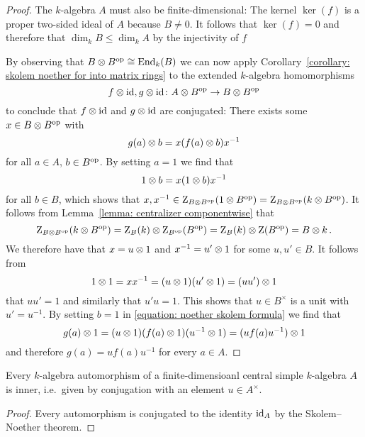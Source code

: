 \begin{proof}
  The $k$-algebra $A$ must also be finite-dimensional:
  The kernel $\ker(f)$ is a proper two-sided ideal of $A$ because $B \neq 0$.
  It follows that $\ker(f) = 0$ and therefore that $\dim_k B \leq \dim_k A$ by the injectivity of $f$
  
  By observing that $B \mathbin{\otimes} B^{\operatorname{op}} \cong \operatorname{End}_k(B)$ we can now apply Corollary~\ref{corollary: skolem noether for into matrix rings} to the extended $k$-algebra homomorphisms
  \[
            f \mathbin{\otimes} \operatorname{id}, g \mathbin{\otimes} \operatorname{id}
    \colon  A \mathbin{\otimes} B^{\operatorname{op}}
    \to     B \mathbin{\otimes} B^{\operatorname{op}}
  \]
  to conclude that $f \mathbin{\otimes} \operatorname{id}$ and $g \mathbin{\otimes} \operatorname{id}$ are conjugated:
  There exists some $x \in B \mathbin{\otimes} B^{\operatorname{op}}$ with
  \begin{equation}
    \label{equation: noether skolem formula}
      g(a) \mathbin{\otimes} b
    = x ( f(a) \mathbin{\otimes} b ) x^{-1}
  \end{equation}
  for all $a \in A$, $b \in B^{\operatorname{op}}$.
  By setting $a = 1$ we find that
  \[
      1 \mathbin{\otimes} b
    = x (1 \mathbin{\otimes} b) x^{-1}
  \]
  for all $b \in B$, which shows that $x, x^{-1} \in \operatorname{Z}_{B \mathbin{\otimes} B^{\operatorname{op}}}(1 \mathbin{\otimes} B^{\operatorname{op}}) = \operatorname{Z}_{B \mathbin{\otimes} B^{\operatorname{op}}}(k \mathbin{\otimes} B^{\operatorname{op}})$.
  It follows from Lemma~\ref{lemma: centralizer componentwise} that
  \[
      \operatorname{Z}_{B \mathbin{\otimes} B^{\operatorname{op}}}(k \mathbin{\otimes} B^{\operatorname{op}})
    = \operatorname{Z}_{B}(k) \mathbin{\otimes} \operatorname{Z}_{B^{\operatorname{op}}}(B^{\operatorname{op}})
    = \operatorname{Z}_{B}(k) \mathbin{\otimes} \operatorname{Z}(B^{\operatorname{op}})
    = B \mathbin{\otimes} k \,.
  \]
  We therefore have that $x = u \mathbin{\otimes} 1$ and $x^{-1} = u' \mathbin{\otimes} 1$ for some $u, u' \in B$.
  It follows from
  \[
      1 \mathbin{\otimes} 1
    = x x^{-1}
    = (u \mathbin{\otimes} 1) (u' \mathbin{\otimes} 1)
    = (u u') \mathbin{\otimes} 1
  \]
  that $u u' = 1$ and similarly that $u' u = 1$.
  This shows that $u \in B^\times$ is a unit with $u' = u^{-1}$.
  By setting $b = 1$ in \eqref{equation: noether skolem formula} we find that
  \[
      g(a) \mathbin{\otimes} 1
    = (u \mathbin{\otimes} 1) (f(a) \mathbin{\otimes} 1) (u^{-1} \mathbin{\otimes} 1)
    = (u f(a) u^{-1}) \mathbin{\otimes} 1
  \]
  and therefore $g(a) = u f(a) u^{-1}$ for every $a \in A$.
\end{proof}


\begin{corollary}
  \label{corollary: skolem noether for automorphisms}
  Every $k$-algebra automorphism of a finite-dimensioanl central simple $k$-algebra $A$ is inner, i.e.\ given by conjugation with an element $u \in A^\times$.
\end{corollary}


\begin{proof}
  Every automorphism is conjugated to the identity $\operatorname{id}_A$ by the Skolem--Noether theorem.
\end{proof}


